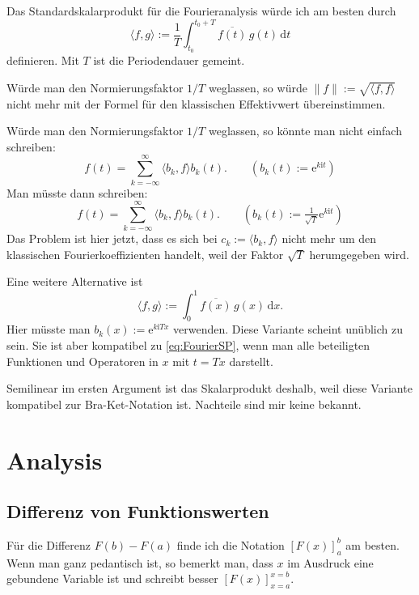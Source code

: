 \documentclass[a4paper,11pt,fleqn]{article}
\newcommand{\ee}{\mathrm e}
\newcommand{\ui}{\mathrm i}
\begin{document}
Das Standardskalarprodukt für die Fourieranalysis würde ich
am besten durch
\begin{equation}\label{eq:FourierSP}
\langle f,g\rangle := \frac{1}{T}\int_{t_0}^{t_0+T}
\overline{f(t)}\,g(t)\,\mathrm dt
\end{equation}
definieren. Mit $T$ ist die Periodendauer gemeint.

Würde man den Normierungsfaktor $1/T$ weglassen, so würde
$\|f\|:=\sqrt{\langle f,f\rangle}$ nicht mehr mit der Formel
für den klassischen Effektivwert übereinstimmen.

Würde man den Normierungsfaktor $1/T$ weglassen, so könnte man
nicht einfach schreiben:
\begin{equation}
f(t) = \sum_{k=-\infty}^\infty \langle b_k,f\rangle b_k(t).
\qquad (b_k(t):=\ee^{k\ui t})
\end{equation}
Man müsste dann schreiben:
\begin{equation}
f(t) = \sum_{k=-\infty}^{\infty} \langle b_k,f\rangle b_k(t).
\qquad(b_k(t):=\tfrac{1}{\sqrt{T}}\ee^{k\ui t})
\end{equation}
Das Problem ist hier jetzt, dass es sich bei $c_k:=\langle b_k,f\rangle$
nicht mehr um den klassischen Fourierkoeffizienten handelt, weil
der Faktor $\sqrt{T}$ herumgegeben wird.

Eine weitere Alternative ist
\begin{equation}
\langle f,g\rangle := \int_0^1 \overline{f(x)}\,g(x)\,\mathrm dx.
\end{equation}
Hier müsste man $b_k(x):=\ee^{k\ui Tx}$ verwenden. Diese Variante
scheint unüblich zu sein. Sie ist aber kompatibel zu
\eqref{eq:FourierSP}, wenn man alle beteiligten Funktionen
und Operatoren in $x$ mit $t=Tx$ darstellt.

Semilinear im ersten Argument ist das Skalarprodukt deshalb, weil
diese Variante kompatibel zur Bra-Ket-Notation ist. Nachteile sind
mir keine bekannt.

\section{Analysis}
\subsection{Differenz von Funktionswerten}
Für die Differenz $F(b)-F(a)$ finde ich die Notation $[F(x)]_a^b$
am besten. Wenn man ganz pedantisch ist, so bemerkt man, dass
$x$ im Ausdruck eine gebundene Variable ist und schreibt besser
$[F(x)]_{x=a}^{x=b}$.
\end{document}
